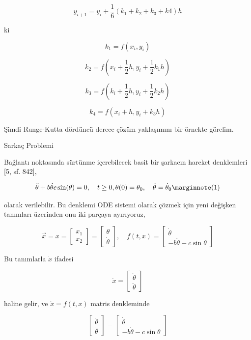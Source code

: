 \documentclass[12pt,fleqn]{article}\usepackage{../../common}
\begin{document}
$$
y_{i+1} = y_i + \frac{1}{6} (k_1 + k_2 + k_3 + k4) h
$$

ki

$$
k_1 = f(x_i,y_i)
$$

$$
k_2 = f \left( x_i + \frac{1}{2} h, y_i + \frac{1}{2}k_1 h  \right)
$$

$$
k_3 = f \left( k_i + \frac{1}{2} h, y_i + \frac{1}{2}k_2 h  \right)
$$

$$
k_4 = f(x_i+h, y_i + k_3 h)
$$

Şimdi Runge-Kutta dördüncü derece çözüm yaklaşımını bir örnekte görelim.

Sarkaç Problemi

Bağlantı noktasında sürtünme içerebilecek basit bir şarkacın hareket denklemleri
[5, sf. 842],

$$
\ddot{\theta} + b\dot{\theta}  c\sin(\theta) = 0,
\quad
t \ge 0, \theta(0)=\theta_0,
\quad
\dot{\theta} = \dot{\theta}_0
\mlabel{1}
$$

olarak verilebilir. Bu denklemi ODE sistemi olarak çözmek için yeni değişken
tanımları üzerinden onu iki parçaya ayırıyoruz,

$$
\vec{x} = x =
\left[\begin{array}{ccc}
    x_1 \\ x_2
\end{array}\right] = 
\left[\begin{array}{c}
    \theta \\ \dot{\theta}
\end{array} \right],
\quad
f(t,x) = \left[\begin{array}{c}
\dot{\theta} \\ -b \dot{\theta} - c\sin\theta
\end{array} \right]
$$

Bu tanımlarla $\dot{x}$ ifadesi

$$
\dot{x} = \left[
  \begin{array}{c} \dot{\theta} \\ \ddot{\theta} \end{array}
\right]
$$

haline gelir,  ve $\dot{x} = f(t,x)$ matris denkleminde 

$$
\left[\begin{array}{c} \dot{\theta} \\ \ddot{\theta} \end{array}\right]=
\left[\begin{array}{c} \dot{\theta} \\ -b \dot{\theta} - c\sin\theta \end{array}\right]
$$
\end{document}
